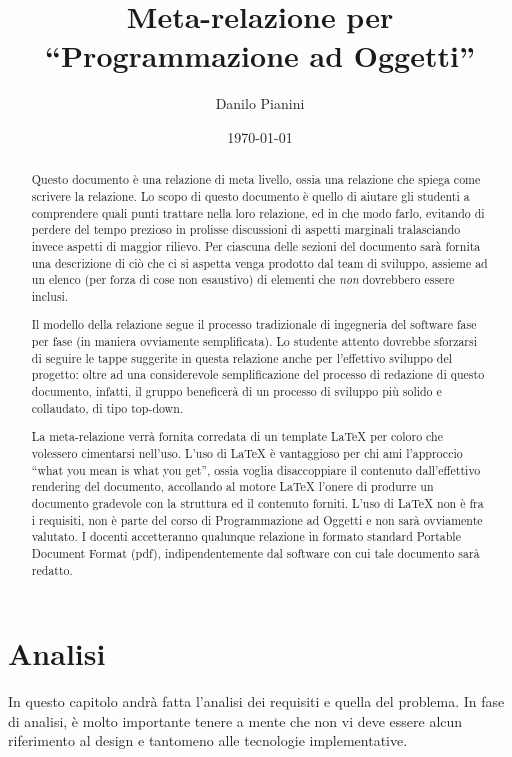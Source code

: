 \documentclass[a4paper,12pt]{report}
\title{Meta-relazione per ``Programmazione ad Oggetti''}
\author{Danilo Pianini}
\date{\today}
\begin{document}
 
\maketitle

\begin{abstract}
Questo documento è una relazione di meta livello, ossia una relazione che spiega come scrivere la relazione.
%
Lo scopo di questo documento è quello di aiutare gli studenti a comprendere quali punti trattare nella loro relazione, ed in che modo farlo, evitando di perdere del tempo prezioso in prolisse discussioni di aspetti marginali tralasciando invece aspetti di maggior rilievo.
%
Per ciascuna delle sezioni del documento sarà fornita una descrizione di ciò che ci si aspetta venga prodotto dal team di sviluppo, assieme ad un elenco (per forza di cose non esaustivo) di elementi che \emph{non} dovrebbero essere inclusi.

Il modello della relazione segue il processo tradizionale di ingegneria del software fase per fase (in maniera ovviamente semplificata).
%
Lo studente attento dovrebbe sforzarsi di seguire le tappe suggerite in questa relazione anche per l'effettivo sviluppo del progetto: oltre ad una considerevole semplificazione del processo di redazione di questo documento, infatti, il gruppo beneficerà di un processo di sviluppo più solido e collaudato, di tipo top-down.

La meta-relazione verrà fornita corredata di un template \LaTeX{} per coloro che volessero cimentarsi nell'uso.
%
L'uso di \LaTeX{} è vantaggioso per chi ami l'approccio ``what you mean is what you get'', ossia voglia disaccoppiare il contenuto dall'effettivo rendering del documento, accollando al motore \LaTeX{} l'onere di produrre un documento gradevole con la struttura ed il contenuto forniti.
%
L'uso di \LaTeX{} non è fra i requisiti, non è parte del corso di Programmazione ad Oggetti e non sarà ovviamente valutato. I docenti accetteranno qualunque relazione in formato standard Portable Document Format (pdf), indipendentemente dal software con cui tale documento sarà redatto.
\end{abstract}

\tableofcontents
 
\chapter{Analisi}

In questo capitolo andrà fatta l'analisi dei requisiti e quella del problema.
%
In fase di analisi, è molto importante tenere a mente che non vi deve essere alcun riferimento al design e tantomeno alle tecnologie implementative.
\end{document}
